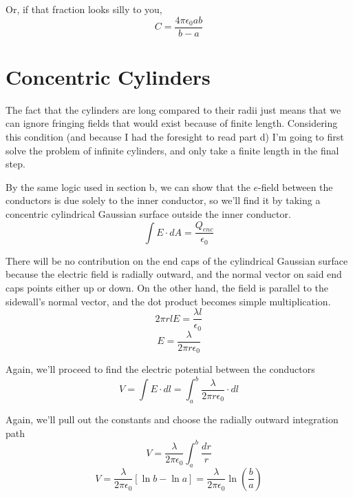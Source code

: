 \documentclass[10pt,a4paper]{article}
\begin{document}
Or, if that fraction looks silly to you,
\begin{equation}
C=\frac{4\pi\epsilon_0 ab}{b-a}
\end{equation}

\section{Concentric Cylinders}
The fact that the cylinders are long compared to their radii just means that we can ignore fringing fields that would exist because of finite length.  Considering this condition (and because I had the foresight to read part d) I'm going to first solve the problem of infinite cylinders, and only take a finite length in the final step.

By the same logic used in section b, we can show that the $e$-field between the conductors is due solely to the inner conductor, so we'll find it by taking a concentric cylindrical Gaussian surface outside the inner conductor.
\begin{equation}
\int E\cdot dA = \frac{Q_{enc}}{\epsilon_0}
\end{equation}

There will be no contribution on the end caps of the cylindrical Gaussian surface because the electric field is radially outward, and the normal vector on said end caps points either up or down. On the other hand, the field is parallel to the sidewall's normal vector, and the dot product becomes simple multiplication.
\begin{equation}
2\pi rlE=\frac{\lambda l}{\epsilon_0}
\end{equation}
\begin{equation}
E=\frac{\lambda}{2\pi r\epsilon_0}
\end{equation}

Again, we'll proceed to find the electric potential between the conductors
\begin{equation}
V=\int E\cdot dl = \int_a^b \frac{\lambda}{2\pi r \epsilon_0} \cdot dl
\end{equation}

Again, we'll pull out the constants and choose the radially outward integration path
\begin{equation}
V=\frac{\lambda}{2\pi \epsilon_0}\int_a^b \frac{dr}{r}
\end{equation}
\begin{equation}
V=\frac{\lambda}{2\pi \epsilon_0}\left[\ln b - \ln a \right]=\frac{\lambda}{2\pi \epsilon_0}\ln\left(\frac{b}{a}\right)
\end{equation}
\end{document}
